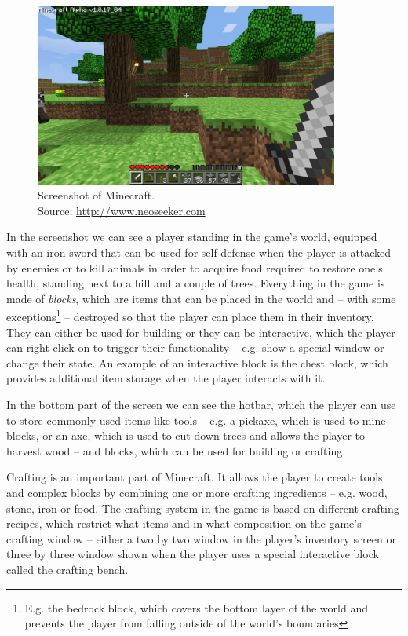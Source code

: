 \begin{figure}[H]
    \centering
    \includegraphics[width=10cm]{../img/minecraft.jpg}
    \caption{Screenshot of Minecraft.
             \\Source: \href{http://i.neoseeker.com/p/Games/PC/Simulation/City/minecraft\_image\_zx2AU2n6bZho0lz.jpg}{http://www.neoseeker.com}}
    \label{minecraft}
\end{figure}

In the screenshot we can see a player standing in the game's world, equipped with an iron sword that can be used for self-defense when the
player is attacked by enemies or to kill animals in order to acquire food required to restore one's health, standing next to a hill and
a couple of trees. Everything in the game is made of \emph{blocks}, which are items that can be placed in the world and
-- with some exceptions\footnote{E.g. the bedrock block, which covers
the bottom layer of the world and prevents the player from falling outside of the world's boundaries} -- destroyed so that the player
can place them in their inventory. They can either be used for building or they can be interactive, which the player can right click on
to trigger their functionality -- e.g. show a special window or change their state. An example of an interactive block is the chest block,
which provides additional item storage when the player interacts with it.

In the bottom part of the screen we can see the hotbar, which the player can use to store commonly used items 
like tools -- e.g. a pickaxe, which is used to mine blocks,
or an axe, which is used to cut down trees and allows the player to harvest wood -- and blocks, which can be used for building or
crafting.

Crafting is an important part of Minecraft. It allows the player to create tools and complex blocks by combining one or more crafting
ingredients -- e.g. wood, stone, iron or food. The crafting system in the game is based on different crafting recipes, which restrict
what items and in what composition on the game's crafting window -- either a two by two window in the player's inventory screen
or three by three window shown when the player uses a special interactive block called the crafting bench.

